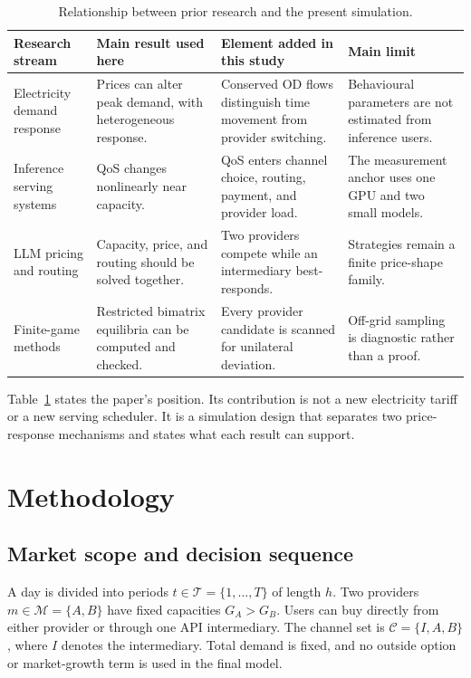 \documentclass[11pt,a4paper]{article}
\newcommand{\T}{\mathcal{T}}
\newcommand{\M}{\mathcal{M}}
\newcommand{\Channels}{\mathcal{C}}
\begin{document}
\begin{table}[H]
\centering
\caption{Relationship between prior research and the present simulation.}
\label{tab:positioning}
\small
\begin{tabular}{@{}>{\raggedright\arraybackslash}p{}>{\raggedright\arraybackslash}p{}>{\raggedright\arraybackslash}p{}>{\raggedright\arraybackslash}p{}@{}}
\toprule
Research stream & Main result used here & Element added in this study & Main limit \\
\midrule
Electricity demand response & Prices can alter peak demand, with heterogeneous response. & Conserved OD flows distinguish time movement from provider switching. & Behavioural parameters are not estimated from inference users. \\
Inference serving systems & QoS changes nonlinearly near capacity. & QoS enters channel choice, routing, payment, and provider load. & The measurement anchor uses one GPU and two small models. \\
LLM pricing and routing & Capacity, price, and routing should be solved together. & Two providers compete while an intermediary best-responds. & Strategies remain a finite price-shape family. \\
Finite-game methods & Restricted bimatrix equilibria can be computed and checked. & Every provider candidate is scanned for unilateral deviation. & Off-grid sampling is diagnostic rather than a proof. \\
\bottomrule
\end{tabular}
\end{table}

Table~\ref{tab:positioning} states the paper's position. Its contribution is not a new electricity tariff or a new serving scheduler. It is a simulation design that separates two price-response mechanisms and states what each result can support.

\section{Methodology}
\label{sec:methodology}

\subsection{Market scope and decision sequence}

A day is divided into periods $t\in\T=\{1,\ldots,T\}$ of length $h$. Two providers $m\in\M=\{A,B\}$ have fixed capacities $G_A>G_B$. Users can buy directly from either provider or through one API intermediary. The channel set is $\Channels=\{I,A,B\}$, where $I$ denotes the intermediary. Total demand is fixed, and no outside option or market-growth term is used in the final model.
\end{document}

